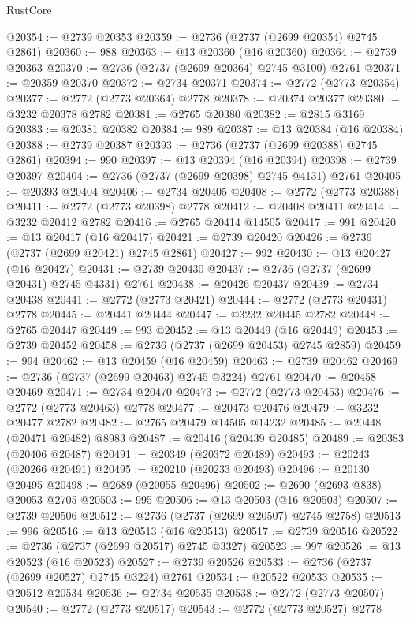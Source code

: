 \begin{lexlean}{RustCore}
\begin{coremodule}
@20354 := @2739 @20353
@20359 := @2736 (@2737 (@2699 @20354) @2745 @2861)
@20360 := 988
@20363 := @13 @20360 (@16 @20360)
@20364 := @2739 @20363
@20370 := @2736 (@2737 (@2699 @20364) @2745 @3100) @2761
@20371 := @20359 @20370
@20372 := @2734 @20371
@20374 := @2772 (@2773 @20354)
@20377 := @2772 (@2773 @20364) @2778
@20378 := @20374 @20377
@20380 := @3232 @20378 @2782
@20381 := @2765 @20380
@20382 := @2815 @3169
@20383 := @20381 @20382
@20384 := 989
@20387 := @13 @20384 (@16 @20384)
@20388 := @2739 @20387
@20393 := @2736 (@2737 (@2699 @20388) @2745 @2861)
@20394 := 990
@20397 := @13 @20394 (@16 @20394)
@20398 := @2739 @20397
@20404 := @2736 (@2737 (@2699 @20398) @2745 @4131) @2761
@20405 := @20393 @20404
@20406 := @2734 @20405
@20408 := @2772 (@2773 @20388)
@20411 := @2772 (@2773 @20398) @2778
@20412 := @20408 @20411
@20414 := @3232 @20412 @2782
@20416 := @2765 @20414 @14505
@20417 := 991
@20420 := @13 @20417 (@16 @20417)
@20421 := @2739 @20420
@20426 := @2736 (@2737 (@2699 @20421) @2745 @2861)
@20427 := 992
@20430 := @13 @20427 (@16 @20427)
@20431 := @2739 @20430
@20437 := @2736 (@2737 (@2699 @20431) @2745 @4331) @2761
@20438 := @20426 @20437
@20439 := @2734 @20438
@20441 := @2772 (@2773 @20421)
@20444 := @2772 (@2773 @20431) @2778
@20445 := @20441 @20444
@20447 := @3232 @20445 @2782
@20448 := @2765 @20447
@20449 := 993
@20452 := @13 @20449 (@16 @20449)
@20453 := @2739 @20452
@20458 := @2736 (@2737 (@2699 @20453) @2745 @2859)
@20459 := 994
@20462 := @13 @20459 (@16 @20459)
@20463 := @2739 @20462
@20469 := @2736 (@2737 (@2699 @20463) @2745 @3224) @2761
@20470 := @20458 @20469
@20471 := @2734 @20470
@20473 := @2772 (@2773 @20453)
@20476 := @2772 (@2773 @20463) @2778
@20477 := @20473 @20476
@20479 := @3232 @20477 @2782
@20482 := @2765 @20479 @14505 @14232
@20485 := @20448 (@20471 @20482) @8983
@20487 := @20416 (@20439 @20485)
@20489 := @20383 (@20406 @20487)
@20491 := @20349 (@20372 @20489)
@20493 := @20243 (@20266 @20491)
@20495 := @20210 (@20233 @20493)
@20496 := @20130 @20495
@20498 := @2689 (@20055 @20496)
@20502 := @2690 (@2693 @838) @20053 @2705
@20503 := 995
@20506 := @13 @20503 (@16 @20503)
@20507 := @2739 @20506
@20512 := @2736 (@2737 (@2699 @20507) @2745 @2758)
@20513 := 996
@20516 := @13 @20513 (@16 @20513)
@20517 := @2739 @20516
@20522 := @2736 (@2737 (@2699 @20517) @2745 @3327)
@20523 := 997
@20526 := @13 @20523 (@16 @20523)
@20527 := @2739 @20526
@20533 := @2736 (@2737 (@2699 @20527) @2745 @3224) @2761
@20534 := @20522 @20533
@20535 := @20512 @20534
@20536 := @2734 @20535
@20538 := @2772 (@2773 @20507)
@20540 := @2772 (@2773 @20517)
@20543 := @2772 (@2773 @20527) @2778

\end{coremodule}
\end{lexlean}
